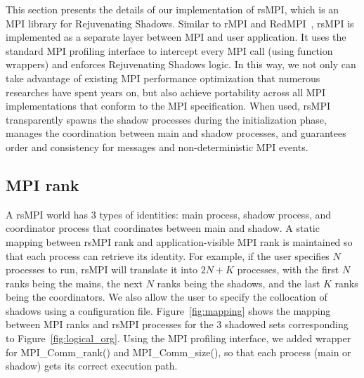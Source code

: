 This section presents the details of our implementation of rsMPI, which is an MPI library for Rejuvenating Shadows. 
Similar to rMPI and RedMPI~\cite{ferreira_sc_2011,fiala_2012_sdc}, rsMPI is implemented as a separate layer between MPI and user application. It uses the standard MPI profiling interface to intercept every MPI call (using function wrappers) and enforces Rejuvenating Shadows logic. In this way, we not only can take advantage of existing MPI performance optimization that numerous researches have spent years on, but also achieve portability across all MPI implementations that conform to the MPI specification.
When used, rsMPI transparently spawns the shadow processes during the initialization phase, manages the coordination between main and shadow processes, and guarantees order and consistency for messages and non-deterministic MPI events.

\subsection{MPI rank}
A rsMPI world has 3 types of identities: main process, shadow process, and coordinator process that coordinates between main and shadow. A static mapping between rsMPI rank and application-visible MPI rank is maintained so that each process can retrieve its identity. For example, if the user specifies $N$ processes to run, rsMPI will translate it into $2N + K$ processes, %
with the first $N$ ranks being the mains, the next $N$ ranks being the shadows, and the last $K$ ranks being the coordinators. 
We also allow the user to specify the collocation of shadows using a configuration file.  Figure~\ref{fig:mapping} shows the mapping between MPI ranks and rsMPI processes for the 3 shadowed sets corresponding to Figure~\ref{fig:logical_org}. Using the MPI profiling interface, we added wrapper for MPI\_Comm\_rank() and MPI\_Comm\_size(), so that each process (main or shadow) gets its correct execution path.

